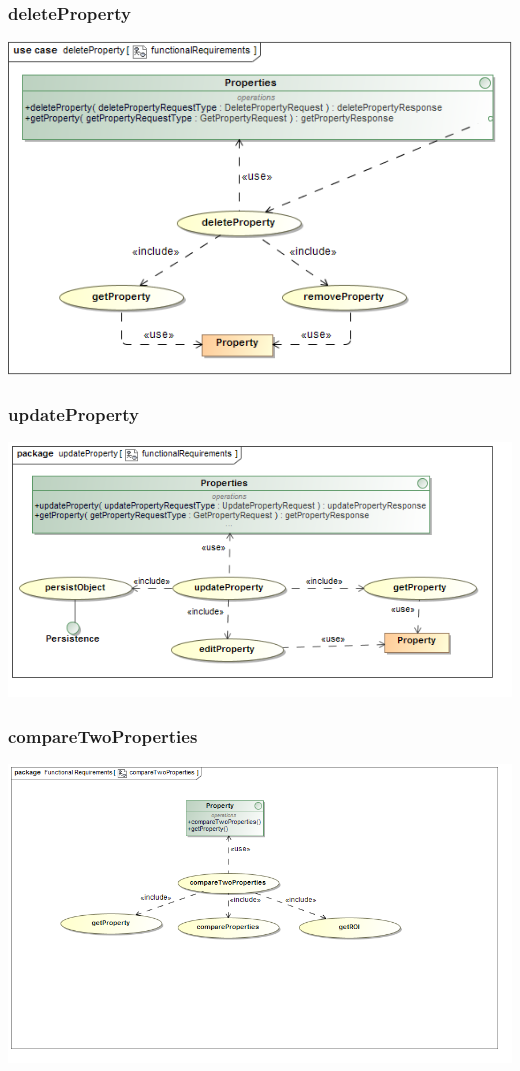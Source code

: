 \documentclass[a4paper,12pt]{article}
\begin{document}
\subsubsection{deleteProperty}
\includegraphics[width=1\textwidth]{./Images/requiredFunctionality/deleteProperty.png}
\subsubsection{updateProperty}
\includegraphics[width=1\textwidth]{./Images/requiredFunctionality/updateProperty.png}
\subsubsection{compareTwoProperties}
\includegraphics[width=1\textwidth]{./Images/requiredFunctionality/compareTwoProperties.png}
\end{document}
